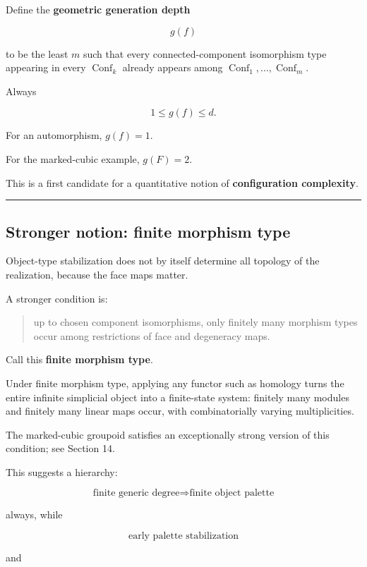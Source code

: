 Define the \textbf{geometric generation depth}

\[
g(f)
\]

to be the least \(m\) such that every connected-component isomorphism
type appearing in every \(\operatorname{Conf}_k\) already appears among
\(\operatorname{Conf}_1,\dots,\operatorname{Conf}_m\).

Always

\[
1\le g(f)\le d.
\]

For an automorphism, \(g(f)=1\).

For the marked-cubic example, \(g(F)=2\).

This is a first candidate for a quantitative notion of
\textbf{configuration complexity}.

\begin{center}\rule{0.5\linewidth}{0.5pt}\end{center}

\subsection{Stronger notion: finite morphism
type}\label{stronger-notion-finite-morphism-type}

Object-type stabilization does not by itself determine all topology of
the realization, because the face maps matter.

A stronger condition is:

\begin{quote}
up to chosen component isomorphisms, only finitely many morphism types
occur among restrictions of face and degeneracy maps.
\end{quote}

Call this \textbf{finite morphism type}.

Under finite morphism type, applying any functor such as homology turns
the entire infinite simplicial object into a finite-state system:
finitely many modules and finitely many linear maps occur, with
combinatorially varying multiplicities.

The marked-cubic groupoid satisfies an exceptionally strong version of
this condition; see Section 14.

This suggests a hierarchy:

\[
\text{finite generic degree}
\Rightarrow
\text{finite object palette}
\]

always, while

\[
\text{early palette stabilization}
\]

and

